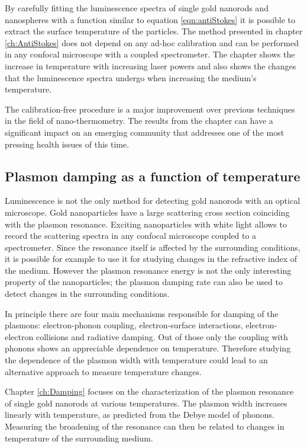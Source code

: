 By carefully fitting the luminescence spectra of single gold nanorods and
nanospheres with a function similar to equation \ref{eqn:antiStokes} it is
possible to extract the surface temperature of the particles. The method
presented in chapter \ref{ch:AntiStokes} does not depend on any ad-hoc
calibration and can be performed in any confocal microscope with a coupled
spectrometer. The chapter shows the increase in temperature with increasing
laser powers and also shows the changes that the luminescence spectra undergo
when increasing the medium's temperature.

The calibration-free procedure is a major improvement over previous techniques
in the field of nano-thermometry. The results from the chapter can have a
significant impact on an emerging community that addresses one of the most
pressing health issues of this time.

\subsection{Plasmon damping as a function of temperature}
Luminescence is not the only method for detecting gold nanorods with an optical
microscope. Gold nanoparticles have a large scattering cross section coinciding
with the plasmon resonance. Exciting nanoparticles with white light allows to
record the scattering spectra in any confocal microscope coupled to a
spectrometer. Since the resonance itself is affected by the surrounding
conditions\cite{Liu2009b,Konrad2013}, it is possible for example to use it for
studying changes in the refractive index of the medium. However the plasmon
resonance energy is not the only interesting property of the nanoparticles; the
plasmon damping rate can also be used to detect changes in the surrounding
conditions.

\begin{sloppypar}

In principle there are four main mechanisms responsible for damping of the
plasmons\cite{Sonnichsen2002,Novo2006,Hu2008}: electron-phonon coupling,
electron-surface interactions, electron-electron collisions and radiative
damping. Out of those only the coupling with phonons shows an appreciable
dependence on temperature\cite{Liu2009b,Konrad2013}. Therefore studying the
dependence of the plasmon width with temperature could lead to an alternative
approach to measure temperature changes.
\end{sloppypar}


Chapter \ref{ch:Damping} focuses on the characterization of the plasmon
resonance of single gold nanorods at various temperatures. The plasmon width
increases linearly with temperature, as predicted from the Debye model of
phonons. Measuring the broadening of the resonance can then be related to
changes in temperature of the surrounding medium. 

